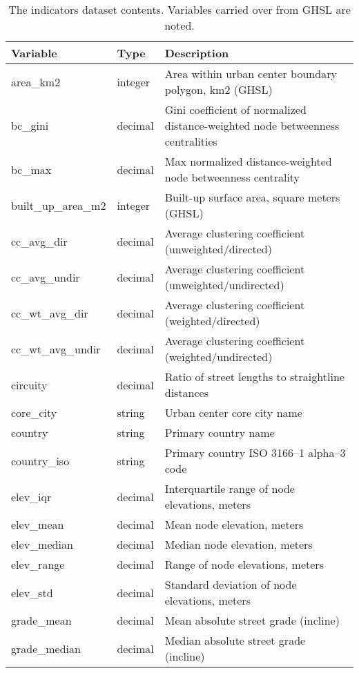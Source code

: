 \documentclass[12pt,letterpaper]{article} %
\begin{document}
\begin{table}[htbp]
    \centering
    \footnotesize
    \caption{The indicators dataset contents. Variables carried over from GHSL are noted.}\label{tab:indicators}
    \begin{tabular}{p{3.8cm} p{1.2cm} p{7.6cm}}
        \toprule
        Variable                      & Type    & Description \\
        \midrule
        area\_km2 & integer & Area within urban center boundary polygon, km2 (GHSL) \\
        bc\_gini & decimal & Gini coefficient of normalized distance-weighted node betweenness centralities \\
        bc\_max & decimal & Max normalized distance-weighted node betweenness centrality \\
        built\_up\_area\_m2 & integer & Built-up surface area, square meters (GHSL) \\
        cc\_avg\_dir & decimal & Average clustering coefficient (unweighted/directed) \\
        cc\_avg\_undir & decimal & Average clustering coefficient (unweighted/undirected) \\
        cc\_wt\_avg\_dir & decimal & Average clustering coefficient (weighted/directed) \\
        cc\_wt\_avg\_undir & decimal & Average clustering coefficient (weighted/undirected) \\
        circuity & decimal & Ratio of street lengths to straightline distances \\
        core\_city & string & Urban center core city name \\
        country & string & Primary country name \\
        country\_iso & string & Primary country ISO 3166--1 alpha--3 code \\
        elev\_iqr & decimal & Interquartile range of node elevations, meters \\
        elev\_mean & decimal & Mean node elevation, meters \\
        elev\_median & decimal & Median node elevation, meters \\
        elev\_range & decimal & Range of node elevations, meters \\
        elev\_std & decimal & Standard deviation of node elevations, meters \\
        grade\_mean & decimal & Mean absolute street grade (incline) \\
        grade\_median & decimal & Median absolute street grade (incline) \\

\end{tabular}
\end{table}
\end{document}
